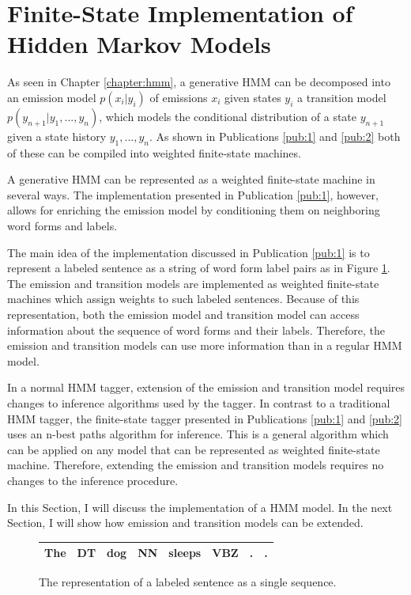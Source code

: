 \section{Finite-State Implementation of Hidden Markov Models} As seen
in Chapter \ref{chapter:hmm}, a generative HMM can be decomposed into
an emission model $p(x_i|y_i)$ of emissions $x_i$ given states $y_i$ a
transition model $p(y_{n+1} | y_1, ..., y_n)$, which models the
conditional distribution of a state $y_{n+1}$ given a state history
$y_1, ..., y_n$. As shown in Publications \ref{pub:1} and \ref{pub:2}
both of these can be compiled into weighted finite-state machines.

A generative HMM can be represented as a weighted finite-state machine
in several ways. The implementation presented in Publication
\ref{pub:1}, however, allows for enriching the emission model by
conditioning them on neighboring word forms and labels.

The main idea of the implementation discussed in Publication
\ref{pub:1} is to represent a labeled sentence as a string of word
form label pairs as in Figure \ref{fig:lab-sent}. The emission and
transition models are implemented as weighted finite-state machines
which assign weights to such labeled sentences. Because of this
representation, both the emission model and transition model can
access information about the sequence of word forms and their
labels. Therefore, the emission and transition models can use more
information than in a regular HMM model. %

In a normal HMM tagger, extension of the emission and transition model
requires changes to inference algorithms used by the tagger. In
contrast to a traditional HMM tagger, the finite-state tagger
presented in Publications \ref{pub:1} and \ref{pub:2} uses an n-best
paths algorithm for inference. This is a general algorithm which can
be applied on any model that can be represented as weighted
finite-state machine. Therefore, extending the emission and transition
models requires no changes to the inference procedure.

In this Section, I will discuss the implementation of a HMM model. In
the next Section, I will show how emission and transition models can
be extended.

\begin{figure}[!htb]
\begin{center}
\begin{tabular}{|l|l|l|l|l|l|l|l|}
\hline
The & DT & dog & NN & sleeps & VBZ & . & .\\
\hline
\end{tabular}
\caption{The representation of a labeled sentence as a single sequence.}\label{fig:lab-sent}
\end{center}
\end{figure}

